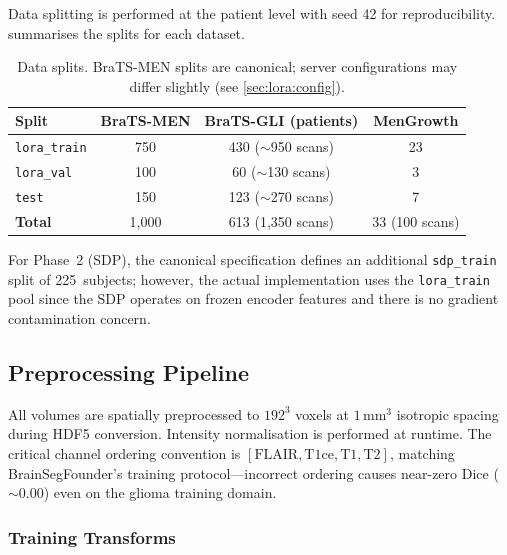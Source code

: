 Data splitting is performed at the patient level with seed 42 for
reproducibility.  summarises the splits for each dataset.

\begin{table}[H]
  \centering
  \caption{Data splits. BraTS-MEN splits are canonical; server configurations
    may differ slightly (see \cref{sec:lora:config}).}
  \label{tab:splits}
  \begin{tabular}{lccc}
    \toprule
    \textbf{Split} & \textbf{BraTS-MEN} & \textbf{BraTS-GLI (patients)} & \textbf{MenGrowth} \\
    \midrule
    \texttt{lora\_train} & 750 & 430 ($\sim$950 scans) & 23 \\
    \texttt{lora\_val}   & 100 & 60 ($\sim$130 scans)  & 3 \\
    \texttt{test}        & 150 & 123 ($\sim$270 scans) & 7 \\
    \midrule
    \textbf{Total} & 1,000 & 613 (1,350 scans) & 33 (100 scans) \\
    \bottomrule
  \end{tabular}
\end{table}

For Phase~2 (SDP), the canonical specification defines an additional
\texttt{sdp\_train} split of 225~subjects; however, the actual implementation
uses the \texttt{lora\_train} pool since the SDP operates on frozen encoder
features and there is no gradient contamination concern.

\subsection{Preprocessing Pipeline}
\label{sec:data:preprocessing}

All volumes are spatially preprocessed to $192^3$ voxels at $1\,\text{mm}^3$
isotropic spacing during HDF5 conversion. Intensity normalisation is performed
at runtime. The critical channel ordering convention is
$[\text{FLAIR}, \text{T1ce}, \text{T1}, \text{T2}]$, matching
BrainSegFounder's training protocol---incorrect ordering causes near-zero
Dice ($\sim 0.00$) even on the glioma training domain.

\subsubsection{Training Transforms}

